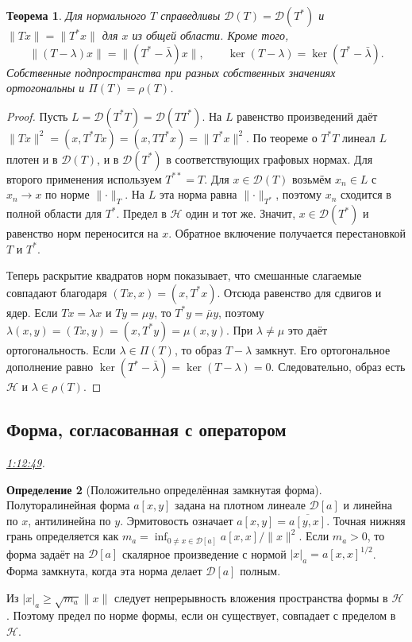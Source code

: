 \documentclass[11pt,a4paper]{article}
\theoremstyle{plain}
\newtheorem{theorem}{Теорема}[section]
\theoremstyle{definition}
\newtheorem{definition}[theorem]{Определение}
\newcommand{\Hh}{\mathcal H}
\newcommand{\Dom}{\mathcal D}
\newcommand{\abs}[1]{\lvert#1\rvert}
\newcommand{\norm}[1]{\lVert#1\rVert}
\newcommand{\at}[3]{\href{https://www.youtube.com/watch?v=#1&t=#2s}{#3}}
\newcommand{\topic}[2]{\Needspace{5\baselineskip}\subsection*{#1}\noindent\emph{#2.}\par\nobreak\smallskip}
\begin{document}
\begin{theorem}
Для нормального $T$ справедливы
$\Dom(T)=\Dom(T^*)$ и $\norm{Tx}=\norm{T^*x}$ для $x$
из общей области. Кроме того,
\[
 \norm{(T-\lambda)x}=\norm{(T^*-\bar\lambda)x},\qquad
 \ker(T-\lambda)=\ker(T^*-\bar\lambda).
\]
Собственные подпространства при разных собственных значениях
ортогональны и $\Pi(T)=\rho(T)$.
\end{theorem}
\begin{proof}
Пусть $L=\Dom(T^*T)=\Dom(TT^*)$. На $L$
равенство произведений даёт
$\norm{Tx}^2=(x,T^*Tx)=(x,TT^*x)=\norm{T^*x}^2$.
По теореме о $T^*T$ линеал $L$ плотен и в $\Dom(T)$,
и в $\Dom(T^*)$ в соответствующих графовых нормах.
Для второго применения используем $T^{**}=T$.
Для $x\in\Dom(T)$ возьмём $x_n\in L$ с
$x_n\to x$ по норме $\norm{\cdot}_T$.
На $L$ эта норма равна $\norm{\cdot}_{T^*}$, поэтому
$x_n$ сходится в полной области для $T^*$.
Предел в $\Hh$ один и тот же. Значит, $x\in\Dom(T^*)$
и равенство норм переносится на $x$.
Обратное включение получается перестановкой $T$ и $T^*$.

Теперь раскрытие квадратов норм показывает, что
смешанные слагаемые совпадают благодаря
$(Tx,x)=(x,T^*x)$. Отсюда равенство для сдвигов и ядер.
Если $Tx=\lambda x$ и $Ty=\mu y$, то $T^*y=\bar\mu y$,
поэтому
$\lambda(x,y)=(Tx,y)=(x,T^*y)=\mu(x,y)$.
При $\lambda\ne\mu$ это даёт ортогональность.
Если $\lambda\in\Pi(T)$, то образ $T-\lambda$
замкнут. Его ортогональное дополнение равно
$\ker(T^*-\bar\lambda)=\ker(T-\lambda)=0$.
Следовательно, образ есть $\Hh$ и $\lambda\in\rho(T)$.
\end{proof}

\topic{Форма, согласованная с оператором}{\at{gTOamZ5pJdY}{4369}{1:12:49}}
\begin{definition}[Положительно определённая замкнутая форма]
Полуторалинейная форма $a[x,y]$ задана на плотном
линеале $\Dom[a]$ и линейна по $x$, антилинейна по $y$.
Эрмитовость означает $a[x,y]=\overline{a[y,x]}$.
Точная нижняя грань определяется как
$m_a=\inf_{0\ne x\in\Dom[a]} a[x,x]/\norm x^2$.
Если $m_a>0$, то форма задаёт на $\Dom[a]$
скалярное произведение с нормой $\abs x_a=a[x,x]^{1/2}$.
Форма замкнута, когда эта норма делает $\Dom[a]$ полным.
\end{definition}
Из $\abs x_a\ge\sqrt{m_a}\norm x$ следует непрерывность
вложения пространства формы в $\Hh$. Поэтому предел
по норме формы, если он существует, совпадает с
пределом в $\Hh$.
\end{document}
